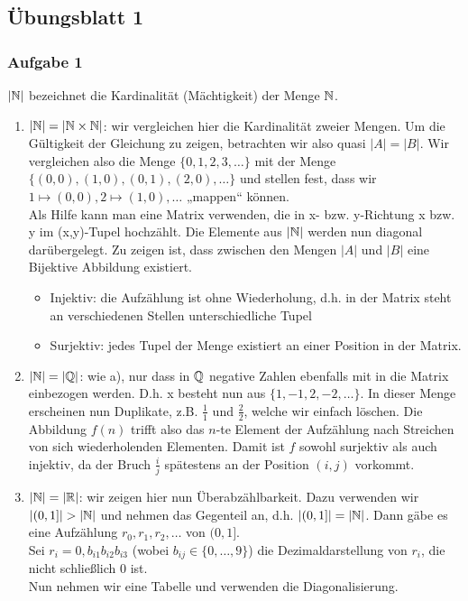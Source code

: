 \subsection*{Übungsblatt 1}

\subsubsection*{Aufgabe 1}
    $|\mathbb{N}|$ bezeichnet die Kardinalität (Mächtigkeit) der Menge $\mathbb{N}$.
    \begin{enumerate}
        \item $|\mathbb{N}| = |\mathbb{N} \times \mathbb{N}|$: wir vergleichen hier die Kardinalität zweier Mengen. Um die Gültigkeit der Gleichung zu zeigen, betrachten wir also quasi $|A| = |B|$. Wir vergleichen also die Menge $\{0, 1, 2, 3, \dots\}$ mit der Menge $\{(0,0), (1,0), (0,1), (2,0), \dots\}$ und stellen fest, dass wir $1 \mapsto (0,0), 2\mapsto(1,0), \dots$ „mappen“ können. \\
        Als Hilfe kann man eine Matrix verwenden, die in x- bzw. y-Richtung x bzw. y im (x,y)-Tupel hochzählt. Die Elemente aus $|\mathbb{N}|$ werden nun diagonal darübergelegt.
        Zu zeigen ist, dass zwischen den Mengen $|A|$ und $|B|$ eine Bijektive Abbildung existiert.
        \begin{itemize}
            \item Injektiv: die Aufzählung ist ohne Wiederholung, d.h. in der Matrix steht an verschiedenen Stellen unterschiedliche Tupel
            \item Surjektiv: jedes Tupel der Menge existiert an einer Position in der Matrix.
        \end{itemize}


        \item $|\mathbb{N}| = |\mathbb{Q}|$: wie a), nur dass in $\mathbb{Q}$ negative Zahlen ebenfalls mit in die Matrix einbezogen werden. D.h. x besteht nun aus $\{1,-1,2,-2,\dots\}$. In dieser Menge erscheinen nun Duplikate, z.B. $\frac{1}{1}$ und $\frac{2}{2}$, welche wir einfach löschen. Die Abbildung $f(n)$ trifft also das $n$-te Element der Aufzählung nach Streichen von sich wiederholenden Elementen. Damit ist $f$ sowohl surjektiv als auch injektiv, da der Bruch $\frac{i}{j}$ spätestens an der Position $(i, j)$ vorkommt.

        \item $|\mathbb{N}| = |\mathbb{R}|$: wir zeigen hier nun Überabzählbarkeit. Dazu verwenden wir $|(0,1]| > |\mathbb{N}|$ und nehmen das Gegenteil an, d.h. $|(0,1]| = |\mathbb{N}|$. Dann gäbe es eine Aufzählung $r_{0}, r_{1}, r_{2},\dots$ von $(0,1]$. \\
            Sei $r_{i} = 0,b_{i1}b_{i2}b_{i3}$ (wobei $b_{ij} \in \{0,\dots,9\}$) die Dezimaldarstellung von $r_{i}$, die nicht schließlich $0$ ist. \\
            Nun nehmen wir eine Tabelle und verwenden die Diagonalisierung.


\end{enumerate}
